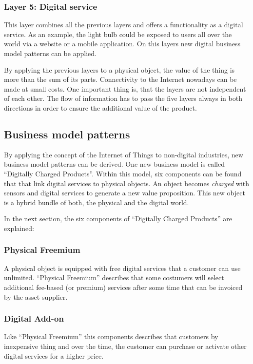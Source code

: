 \subsubsection{Layer 5: Digital service}
This layer combines all the previous layers and offers a functionality as a digital service. As an example, the light bulb could be exposed to users all over the world via a website or a mobile application. On this layers new digital business model patterns can be applied.

By applying the previous layers to a physical object, the value of the thing is more than the sum of its parts. Connectivity to the Internet nowadays can be made at small costs. One important thing is, that the layers are not independent of each other. The flow of information has to pass the five layers always in both directions in order to ensure the additional value of the product.

\subsection{Business model patterns}
By applying the concept of the Internet of Things to non-digital industries, new business model patterns can be derived. One new business model is called ``Digitally Charged Products''. Within this model, six components can be found that that link digital services to physical objects. An object becomes \textit{charged} with sensors and digital services to generate a new value proposition. This new object is a hybrid bundle of both, the physical and the digital world.

In the next section, the six components of ``Digitally Charged Products'' are explained:

\subsubsection{Physical Freemium}
A physical object is equipped with free digital services that a customer can use unlimited. ``Physical Freemium'' describes that some costumers will select additional fee-based (or premium) services after some time that can be invoiced by the asset supplier.

\subsubsection{Digital Add-on}
Like ``Physical Freemium'' this components describes that customers by inexpensive thing and over the time, the customer can purchase or activate other digital services for a higher price.


